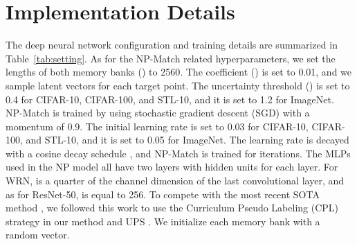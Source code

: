 \documentclass[nohyperref]{article}
\theoremstyle{plain}
\theoremstyle{definition}
\theoremstyle{remark}
\begin{document}
\section{Implementation Details}
The deep neural network configuration and training details are summarized in Table~\ref{tab:setting}. 
As for the NP-Match related hyperparameters, we set the lengths of both memory banks () to 2560. The coefficient () is set to 0.01, and we sample  latent vectors for each target point. The uncertainty threshold () is set to 0.4 for CIFAR-10, CIFAR-100, and  STL-10, and it is set to 1.2 for ImageNet. NP-Match is trained by using stochastic gradient descent (SGD) with a momentum of 0.9.
The initial learning rate is set to 0.03 for CIFAR-10, CIFAR-100, and STL-10, and it is set to 0.05 for ImageNet.
The learning rate is decayed with a cosine decay
schedule \cite{loshchilov2016sgdr}, and NP-Match is trained for  iterations. The MLPs used in the NP model all have two layers with  hidden units for each layer. For WRN,  is a quarter of the channel dimension of the last convolutional layer, and as for ResNet-50,  is equal to 256. To compete with the most recent SOTA method \cite{zhang2021flexmatch}, we followed this work to use the Curriculum Pseudo Labeling (CPL) strategy in our method and UPS \cite{rizve2021defense}. We initialize each memory bank with a random vector.  

\begin{table}[h]
\centering 
{}
 \caption{Details of the training setting.} 
 \label{tab:setting} 
 \end{table}
\end{document}
